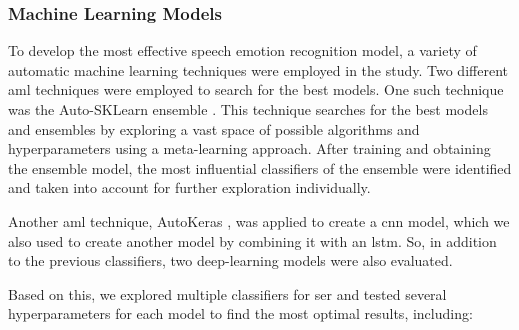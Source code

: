 \subsubsection{Machine Learning Models}

To develop the most effective speech emotion recognition model, a variety of automatic machine learning techniques were employed in the study. Two different \ac{aml} techniques were employed to search for the best models. One such technique was the Auto-SKLearn ensemble \cite{feurerneurips15a}. This technique searches for the best models and ensembles by exploring a vast space of possible algorithms and hyperparameters using a meta-learning approach. After training and obtaining the ensemble model, the most influential classifiers of the ensemble were identified and taken into account for further exploration individually.

Another \ac{aml} technique, AutoKeras \cite{jin2019auto}, was applied to create a \ac{cnn} model, which we also used to create another model by combining it with an \ac{lstm}. So, in addition to the previous classifiers, two deep-learning models were also evaluated.

Based on this, we explored multiple classifiers for \ac{ser} and tested several hyperparameters for each model to find the most optimal results, including:

